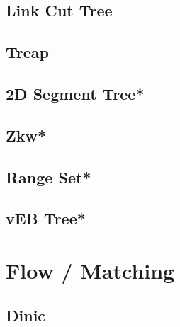 \subsection{Link Cut Tree}

\subsection{Treap}

% 
\subsection{2D Segment Tree*}

\subsection{Zkw*}

% 
\subsection{Range Set*}
\subsection{vEB Tree*}
% 

\section{Flow / Matching}
\subsection{Dinic}

